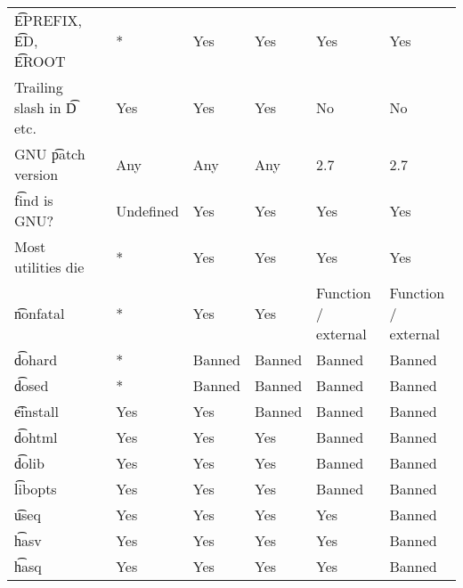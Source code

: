 \begin{landscape}
\begin{longtable}{llP{7.5em}P{7.5em}P{7.5em}P{7.5em}P{7.5em}}
\t{EPREFIX}, \t{ED}, \t{EROOT} &  &
    * & Yes & Yes & Yes & Yes \\

Trailing slash in \t{D} etc. &  &
    Yes & Yes & Yes & No & No \\

GNU \t{patch} version &  &
    Any & Any & Any & 2.7 & 2.7 \\

\t{find} is GNU? &  &
    Undefined & Yes & Yes & Yes & Yes \\

Most utilities die &  &
    * & Yes & Yes & Yes & Yes \\

\t{nonfatal} &  &
    * & Yes & Yes & Function / external & Function / external \\

\t{dohard} &  &
    * & Banned & Banned & Banned & Banned \\

\t{dosed} &  &
    * & Banned & Banned & Banned & Banned \\

\t{einstall} &  &
    Yes & Yes & Banned & Banned & Banned \\

\t{dohtml} &  &
    Yes & Yes & Yes & Banned & Banned \\

\t{dolib} &  &
    Yes & Yes & Yes & Banned & Banned \\

\t{libopts} &  &
    Yes & Yes & Yes & Banned & Banned \\

\t{useq} &  &
    Yes & Yes & Yes & Yes & Banned \\

\t{hasv} &  &
    Yes & Yes & Yes & Yes & Banned \\

\t{hasq} &  &
    Yes & Yes & Yes & Yes & Banned \\


\end{longtable}
\end{landscape}
